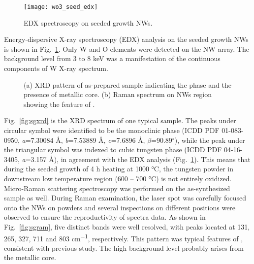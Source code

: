 \begin{figure}[htb]
\centering
\texttt{[image: wo3\_seed\_edx]}
\caption[Composition analysis on seeded growth  NWs]{EDX spectroscopy on seeded growth  NWs.}
\label{fig:woedx}
\end{figure}
Energy-dispersive X-ray spectroscopy (EDX) analysis on the seeded growth  NWs is shown in Fig.~\ref{fig:woedx}. Only W and O elements were detected on the NW array. The background level from 3 to 8 keV was a manifestation of the continuous components of W X-ray spectrum. 

\begin{figure}[htb]
\centering
{}\hspace{0.04\textwidth}
\caption[Characterization of seeded growth : XRD and Raman]{ (a) XRD pattern of as-prepared sample indicating the  phase and the presence of metallic core. (b) Raman spectrum on NWs region showing the feature of .}
\label{fig:woseedxrd}
\end{figure}

Fig.~\ref{fig:sgxrd} is the XRD spectrum of one typical sample. The peaks under circular symbol were identified to be the monoclinic  phase (ICDD PDF 01-083-0950, \emph{a}=7.30084 \AA, \emph{b}=7.53889 \AA, \emph{c}=7.6896 \AA, $\beta$=90.89$^\circ$), while the peak under the triangular symbol was indexed to cubic tungsten phase (ICDD PDF 04-16-3405, \emph{a}=3.157 \AA), in agreement with the EDX analysis (Fig.~\ref{fig:woedx}). This means that during the  seeded growth of 4 h heating at 1000 \si{\degreeCelsius}, the tungsten powder in downstream low temperature region (600 -- 700 \si{\degreeCelsius}) is not entirely oxidized. Micro-Raman scattering spectroscopy was performed on the as-synthesized sample as well. During Raman examination, the laser spot was carefully focused onto the NWs on powders and several inspections on different positions were observed to ensure the reproductivity of spectra data. As shown in Fig.~\ref{fig:sgram}, five distinct bands were well resolved, with peaks located at 131, 265, 327, 711 and 803 \si{cm^{-1}}, respectively. This pattern was typical features of , consistent with previous study.\cite{Salje1975a,Dixit1986} The high background level probably arises from the metallic core.

